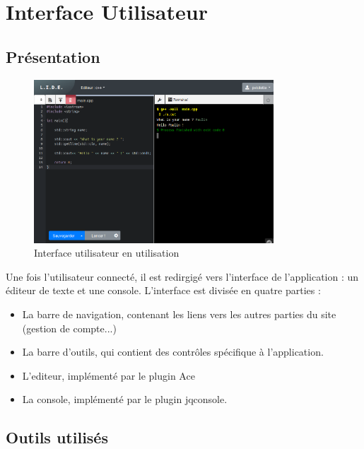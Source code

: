 \chapter{Interface Utilisateur}

\section{Présentation}

\begin{figure}[h]
  \centering
  \includegraphics[width=0.8\textwidth]{./frontend/example1.png}
  \caption{Interface utilisateur en utilisation}
  \label{}
\end{figure}

Une fois l'utilisateur connecté, il est redirgigé vers l'interface de l'application : un éditeur de texte et une console.
L'interface est divisée en quatre parties :
\begin{itemize}
  \item La barre de navigation, contenant les liens vers les autres parties du site (gestion de compte...)
  \item La barre d'outils, qui contient des contrôles spécifique à l'application.
  \item L'editeur, implémenté par le plugin Ace
  \item La console, implémenté par le plugin jqconsole.
\end{itemize}

\section{Outils utilisés}

